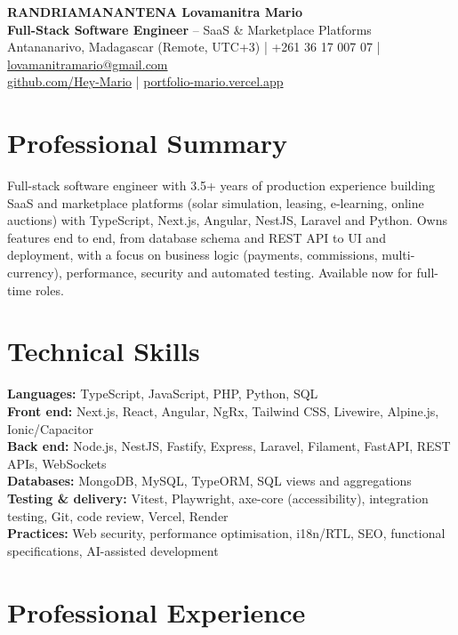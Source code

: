 \documentclass[10pt,a4paper]{article}
\begin{document}
\begin{center}
  {\LARGE\bfseries RANDRIAMANANTENA Lovamanitra Mario}\\[3pt]
  {\large\color{accent}\textbf{Full-Stack Software Engineer}} -- SaaS \& Marketplace Platforms\\[3pt]
  Antananarivo, Madagascar (Remote, UTC+3) | +261 36 17 007 07 |
  \href{mailto:lovamanitramario@gmail.com}{lovamanitramario@gmail.com}\\
  \href{https://github.com/Hey-Mario}{github.com/Hey-Mario} |
  \href{https://portfolio-mario.vercel.app}{portfolio-mario.vercel.app}
\end{center}

\section*{Professional Summary}
Full-stack software engineer with 3.5+ years of production experience building SaaS and marketplace
platforms (solar simulation, leasing, e-learning, online auctions) with TypeScript, Next.js, Angular,
NestJS, Laravel and Python. Owns features end to end, from database schema and REST API to UI and deployment,
with a focus on business logic (payments, commissions, multi-currency), performance, security and
automated testing. Available now for full-time roles.

\section*{Technical Skills}
\textbf{Languages:} TypeScript, JavaScript, PHP, Python, SQL\\
\textbf{Front end:} Next.js, React, Angular, NgRx, Tailwind CSS, Livewire, Alpine.js, Ionic/Capacitor\\
\textbf{Back end:} Node.js, NestJS, Fastify, Express, Laravel, Filament, FastAPI, REST APIs, WebSockets\\
\textbf{Databases:} MongoDB, MySQL, TypeORM, SQL views and aggregations\\
\textbf{Testing \& delivery:} Vitest, Playwright, axe-core (accessibility), integration testing, Git, code review, Vercel, Render\\
\textbf{Practices:} Web security, performance optimisation, i18n/RTL, SEO, functional specifications, AI-assisted development

\section*{Professional Experience}
\end{document}
